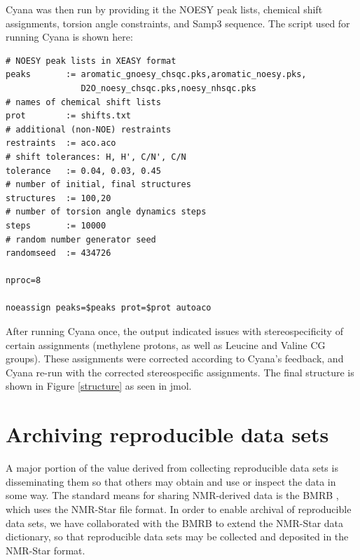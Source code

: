 Cyana was then run by providing it the NOESY peak lists, chemical shift
assignments, torsion angle constraints, and Samp3 sequence.  The script
used for running Cyana is shown here:
\begin{verbatim}
# NOESY peak lists in XEASY format
peaks       := aromatic_gnoesy_chsqc.pks,aromatic_noesy.pks,
               D2O_noesy_chsqc.pks,noesy_nhsqc.pks
# names of chemical shift lists
prot        := shifts.txt                
# additional (non-NOE) restraints
restraints  := aco.aco                   
# shift tolerances: H, H', C/N', C/N
tolerance   := 0.04, 0.03, 0.45          
# number of initial, final structures
structures  := 100,20                    
# number of torsion angle dynamics steps
steps       := 10000                    
# random number generator seed
randomseed  := 434726                    

nproc=8

noeassign peaks=$peaks prot=$prot autoaco
\end{verbatim}
After running Cyana once, the output indicated issues with stereospecificity
of certain assignments (methylene protons, as well as Leucine and Valine
CG groups).  These assignments were corrected according to Cyana's feedback,
and Cyana re-run with the corrected stereospecific assignments.
The final structure is shown in Figure \ref{structure} as seen in jmol.




\section{Archiving reproducible data sets}
A major portion of the value derived from collecting reproducible data sets
is disseminating them so that others may obtain and use or inspect the data
in some way.  The standard means for sharing NMR-derived data is the BMRB
\cite{bmrb}, which uses the NMR-Star file format.  In order to enable archival
of reproducible data sets, we have collaborated with the BMRB to extend the
NMR-Star data dictionary, so that reproducible data sets may be collected and
deposited in the NMR-Star format.

